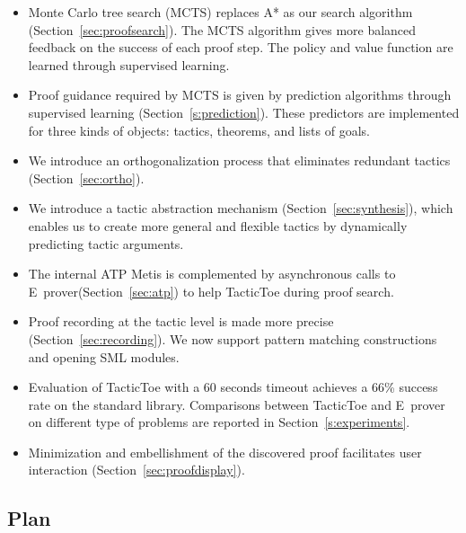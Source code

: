 \documentclass[runningheads,a4paper,draft]{svjour3}
\def\eprover{\textsf{E~prover}\xspace}
\def\sml{\textsf{SML}\xspace}
\def\metis{\textsf{Metis}\xspace}
\def\tactictoe{\textsf{TacticToe}\xspace}
\begin{document}
\begin{itemize}
\item Monte Carlo tree search (MCTS) replaces A* as our
  search algorithm (Section~\ref{sec:proofsearch}). The MCTS algorithm gives
more balanced feedback on
the success of each proof step. The policy and
value function are learned
through supervised learning.
\item Proof guidance required by MCTS is given by prediction algorithms
through supervised learning (Section~\ref{s:prediction}).
These predictors are implemented for three kinds of objects: tactics,
theorems, and lists of goals.
\item We introduce an orthogonalization process that eliminates redundant tactics (Section~\ref{sec:ortho}).
\item We introduce a tactic abstraction mechanism
  (Section~\ref{sec:synthesis}), which enables us to create
more general and flexible tactics by dynamically
predicting tactic arguments.
\item The internal ATP \metis is complemented
  by asynchronous calls to \eprover (Section~\ref{sec:atp}) to help \tactictoe
during proof search.
\item Proof recording at the tactic level is made more precise
  (Section~\ref{sec:recording}). We now support pattern
matching constructions and opening SML modules.
\item Evaluation of \tactictoe with a 60 seconds timeout achieves a 66\%
success rate on the standard library. Comparisons between
\tactictoe and \eprover on different type of problems are reported in
Section~\ref{s:experiments}.

\item Minimization and embellishment of the discovered proof facilitates user
  interaction (Section~\ref{sec:proofdisplay}).
\end{itemize}

\subsection{Plan}
\end{document}
